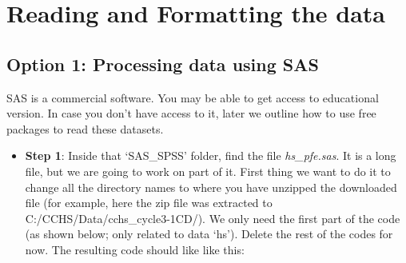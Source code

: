 \documentclass[
]{book}
\newenvironment{Shaded}{\begin{snugshade}}{\end{snugshade}}
\newcommand{\NormalTok}[1]{#1}
\newcommand{\StringTok}[1]{\textcolor[rgb]{0.31,0.60,0.02}{#1}}
\providecommand{\tightlist}{%
  \setlength{\itemsep}{0pt}\setlength{\parskip}{0pt}}
\begin{document}
\hypertarget{reading-and-formatting-the-data}{%
\section{Reading and Formatting the data}\label{reading-and-formatting-the-data}}

\hypertarget{option-1-processing-data-using-sas}{%
\subsection{Option 1: Processing data using SAS}\label{option-1-processing-data-using-sas}}

SAS is a commercial software. You may be able to get access to educational version. In case you don't have access to it, later we outline how to use free packages to read these datasets.

\begin{itemize}
\tightlist
\item
  \textbf{Step 1}: Inside that `SAS\_SPSS' folder, find the file \emph{hs\_pfe.sas}. It is a long file, but we are going to work on part of it. First thing we want to do it to change all the directory names to where you have unzipped the downloaded file (for example, here the zip file was extracted to C:/CCHS/Data/cchs\_cycle3-1CD/). We only need the first part of the code (as shown below; only related to data `hs'). Delete the rest of the codes for now. The resulting code should like like this:
\end{itemize}

\begin{Shaded}
\end{Shaded}
\end{document}
